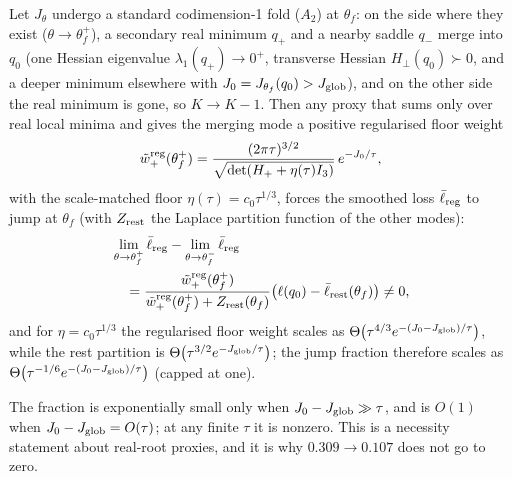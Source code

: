 \begin{proposition}\label{prop:q5b}
Let $J_\theta$ undergo a standard codimension-1 fold ($A_2$) at $\theta_f$: on the side where they exist ($\theta\to\theta_f^+$), a secondary real minimum $q_+$ and a nearby saddle $q_-$ merge into $q_0$ (one Hessian eigenvalue $\lambda_1(q_+)\to0^+$, transverse Hessian $H_\perp(q_0)\succ0$, and a deeper minimum elsewhere with $J_0=J_{\theta_f}(q_0)>J_{\rm glob}$), and on the other side the real minimum is gone, so $K\to K-1$. Then any proxy that sums only over real local minima and gives the merging mode a positive regularised floor weight
\begin{equation}
\tilde w_+^{\rm reg}(\theta_f^+)=\frac{(2\pi\tau)^{3/2}}{\sqrt{\det(H_++\eta(\tau)I_3)}}\,e^{-J_0/\tau},
\label{eq:floorweight}
\end{equation}
with the scale-matched floor $\eta(\tau)=c_0\tau^{1/3}$, forces the smoothed loss $\bar\ell_{\rm reg}$ to jump at $\theta_f$ (with $Z_{\rm rest}$ the Laplace partition function of the other modes):
\begin{equation}
\begin{split}
&\lim_{\theta\to\theta_f^+}\bar\ell_{\rm reg}-\lim_{\theta\to\theta_f^-}\bar\ell_{\rm reg}\\
&\quad=\frac{\tilde w_+^{\rm reg}(\theta_f^+)}{\tilde w_+^{\rm reg}(\theta_f^+)+Z_{\rm rest}(\theta_f)}\big(\ell(q_0)-\bar\ell_{\rm rest}(\theta_f)\big)\neq0,
\end{split}
\label{eq:jump}
\end{equation}
and for $\eta=c_0\tau^{1/3}$ the regularised floor weight scales as $\Theta\big(\tau^{4/3}e^{-(J_0-J_{\rm glob})/\tau}\big)$, while the rest partition is $\Theta\big(\tau^{3/2}e^{-J_{\rm glob}/\tau}\big)$; the jump fraction therefore scales as $\Theta\big(\tau^{-1/6}e^{-(J_0-J_{\rm glob})/\tau}\big)$ (capped at one).
\end{proposition}

The fraction is exponentially small only when $J_0-J_{\rm glob}\gg\tau$, and is $O(1)$ when $J_0-J_{\rm glob}=O(\tau)$; at any finite $\tau$ it is nonzero. This is a necessity statement about real-root proxies, and it is why $0.309\to0.107$ does not go to zero.

